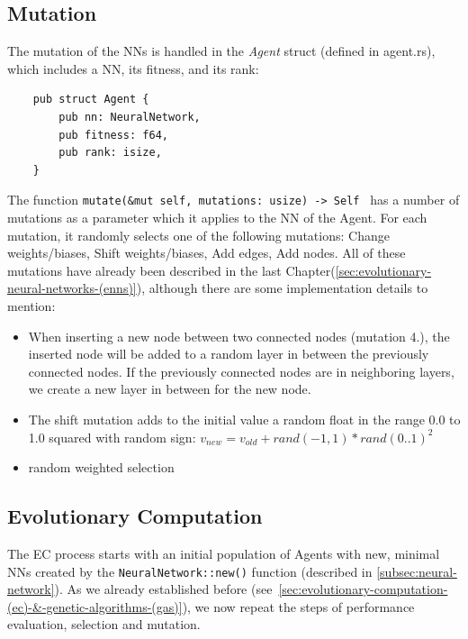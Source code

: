\documentclass[11pt]{report}
\begin{document}
\begin{enumerate}
            \subsection{Mutation}\label{subsec:mutation}
    The mutation of the NNs is handled in the \textit{Agent} struct (defined in agent.rs), which includes a NN, its fitness, and its rank:
    \begin{verbatim}
    pub struct Agent {
        pub nn: NeuralNetwork,
        pub fitness: f64,
        pub rank: isize,
    }
    \end{verbatim}
    The function \texttt{mutate(&mut self, mutations: usize) -> Self {} } has a number of mutations as a parameter which it applies to the NN of the Agent.
    For each mutation, it randomly selects one of the following mutations: Change weights/biases, Shift weights/biases, Add edges, Add nodes.
    All of these mutations have already been described in the last Chapter(\ref{sec:evolutionary-neural-networks-(enns)}), although there are some implementation details to mention:
    \begin{itemize}
        \item When inserting a new node between two connected nodes (mutation 4.), the inserted node will be added to a random layer in between the previously connected nodes.
        If the previously connected nodes are in neighboring layers, we create a new layer in between for the new node.
        \item The shift mutation adds to the initial value a random float in the range 0.0 to 1.0 squared with random sign:
        $v_{new} = v_{old} + rand(-1, 1) * rand(0..1)^2$
        \item random weighted selection
    \end{itemize}

            \subsection{Evolutionary Computation}\label{subsec:natural-slection}
    The EC process starts with an initial population of Agents with new, minimal NNs created by the \texttt{NeuralNetwork::new()} function (described in \ref{subsec:neural-network}).
    As we already established before (see~\ref{sec:evolutionary-computation-(ec)-&-genetic-algorithms-(gas)}), we now repeat the steps of performance evaluation, selection and mutation.

\end{enumerate}
\end{document}
